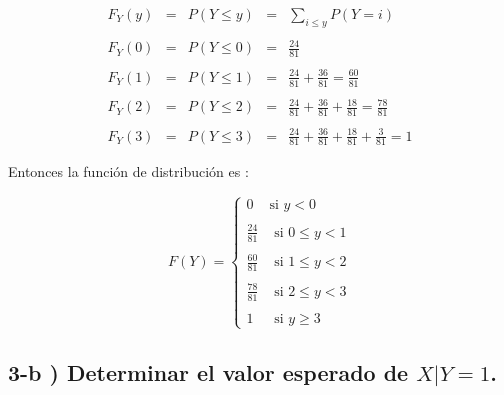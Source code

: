 \documentclass[12pt]{article}
\begin{document}
\begin{equation*}
    \begin{array}{rcccl}
        F_Y\left(y\right) & = & P\left(Y \leq y\right)
                         & = & \displaystyle \sum_{i\leq y} P\left(Y=i\right)
        \\
        \\
        F_Y\left(0\right) & = & P\left(Y\leq0\right)        & = & \displaystyle \frac{24}{81}
        \\
        \\
        F_Y\left(1\right) & = & P\left(Y\leq1\right)        & = & \displaystyle \frac{24}{81} + \frac{36}{81} = \frac{60}{81}
        \\
        \\
        F_Y\left(2\right) & = & P\left(Y\leq2\right)        & = & \displaystyle \frac{24}{81} + \frac{36}{81} + \frac{18}{81} = \frac{78}{81}
        \\
        \\
        F_Y\left(3\right) & = & P\left(Y\leq3\right)        & = & \displaystyle \frac{24}{81} + \frac{36}{81} + \frac{18}{81} + \frac{3}{81}  = 1
    \end{array}
\end{equation*}

\begin{flushleft}
    Entonces la funci\'on de distribuci\'on es : 
\end{flushleft}

\begin{equation*}
    F\left(Y\right) = \begin{cases}
        0           & \mbox{si   $y < 0 $}
        \\
        \\
        \displaystyle \frac{24}{81} & \mbox{   si   $0\leq y < 1$}
        \\
        \\
        \displaystyle \frac{60}{81} & \mbox{   si   $1\leq y < 2$}
        \\
        \\
        \displaystyle \frac{78}{81} & \mbox{   si   $2\leq y < 3$}
        \\
        \\
        1           & \mbox{     si   $y \geq 3$}
    \end{cases}
\end{equation*}

\subsection*{ 3-b ) Determinar el valor esperado de $ X|Y = 1$.}
\end{document}
